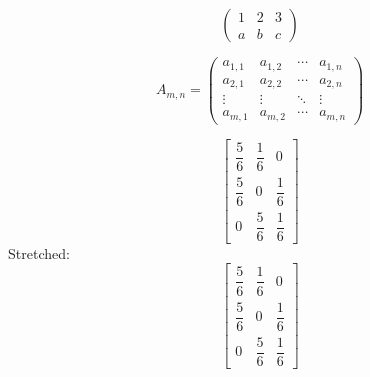 $$\begin{pmatrix}
1 & 2 & 3\\
a & b & c
\end{pmatrix}$$


\begin{equation*}
A_{m,n} = 
\begin{pmatrix}
a_{1,1} & a_{1,2} & \cdots & a_{1,n} \\
a_{2,1} & a_{2,2} & \cdots & a_{2,n} \\
\vdots  & \vdots  & \ddots & \vdots  \\
a_{m,1} & a_{m,2} & \cdots & a_{m,n} 
\end{pmatrix}
\end{equation*}

\[
    \left[
         \begin{array}{ccc}
         \dfrac{5}{6} & \dfrac{1}{6} & 0           \\
         \dfrac{5}{6} & 0           & \dfrac{1}{6} \\
         0           & \dfrac{5}{6} & \dfrac{1}{6}
        \end{array}
    \right]
\]
\renewcommand{\arraystretch}{2.5}
Stretched:
\[
    \left[
         \begin{array}{ccc}
         \dfrac{5}{6} & \dfrac{1}{6} & 0           \\
         \dfrac{5}{6} & 0           & \dfrac{1}{6} \\
         0           & \dfrac{5}{6} & \dfrac{1}{6}
        \end{array}
    \right]
\]

